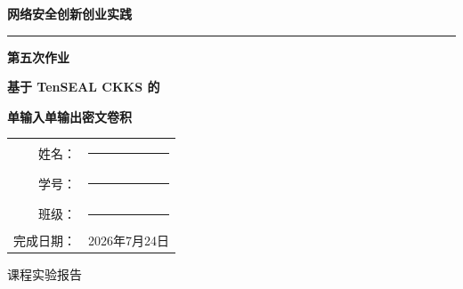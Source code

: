 \documentclass[UTF8,a4paper,zihao=-4]{ctexart}
\begin{document}
\begin{titlepage}
  \centering
  \vspace*{1.8cm}
  {\bfseries 网络安全创新创业实践\par}
  \vspace{0.8cm}
  {\color{navy}\rule{0.78\textwidth}{1.4pt}\par}
  \vspace{1.25cm}
  {\bfseries 第五次作业\par}
  \vspace{0.45cm}
  {\bfseries 基于 TenSEAL CKKS 的\par}
  {\bfseries 单输入单输出密文卷积\par}
  \vspace{1.8cm}
  \begin{tcolorbox}[width=0.76\textwidth,colback=paper,colframe=navy!65,arc=1mm]
    \centering
    \begin{tabular}{rl}
      姓名： & \rule{7cm}{0.4pt}\\[0.7em]
      学号： & \rule{7cm}{0.4pt}\\[0.7em]
      班级： & \rule{7cm}{0.4pt}\\[0.7em]
      完成日期： & 2026年7月24日
    \end{tabular}
  \end{tcolorbox}
  \vfill
  {\large 课程实验报告\par}
  \vspace{0.8cm}
\end{titlepage}

\begin{abstract}
本作业选择开源全同态加密库 TenSEAL 0.3.16，以 Microsoft SEAL 为后端，完成单输入、单输出的 $4\times4$ 输入与 $3\times3$ 卷积核密文卷积。步长为 1、填充为 0，按 CNN Conv2D 的互相关语义得到 $2\times2$ 输出。客户端使用 CKKS 参数 $N=8192$、系数模数位长链 $[60,40,40,60]$ 和全局缩放因子 $2^{40}$，通过 \texttt{im2col\_encoding} 将四个滑动窗口打包并加密；服务器只持有不含私钥的公开评估上下文，使用 \texttt{conv2d\_im2col} 完成密文与明文卷积核的乘加，客户端最终解密。

明文手算和独立 Python 参考实现均得到
$\left[\begin{smallmatrix}26&31\\46&51\end{smallmatrix}\right]$。对完整流程执行 10 次独立试验，10 个输入密文的 SHA-256 均不同，全部输出满足 $10^{-3}$ 绝对误差阈值；所有试验的最大绝对误差为 $6.882\times10^{-6}$，平均绝对误差为 $5.106\times10^{-6}$。服务器上下文的 \texttt{has\_secret\_key} 和 \texttt{is\_private} 均为 false。中位耗时分别为加密与序列化 \SI{10.402}{ms}、服务器加载/计算/序列化 \SI{14.575}{ms}、客户端加载与解密 \SI{2.328}{ms}。报告给出原始要求、资料学习、算法推导、威胁模型、代码、运行结果、可视化、自动化测试、局限和参考文献。

\noindent\textbf{关键词：}全同态加密；CKKS；TenSEAL；Microsoft SEAL；密文卷积；im2col；SIMD 打包
\end{abstract}
\end{document}

